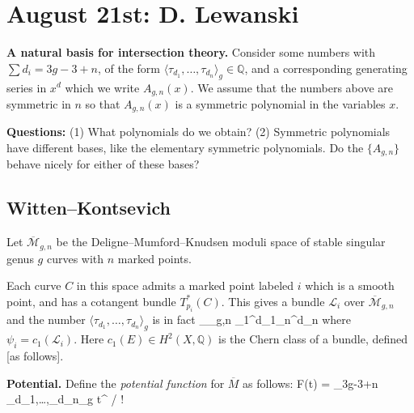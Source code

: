 \documentclass[fleqn,a4paper, twoside]{article}
\title{\vspace{-5 em}\setstretch{0.85}{\textbf{Matamzee 2021}}}
\author{P. Tamaroff}
\date{August 2021}
\makeatletter
\newcommand{\0}{\langle 0\rangle}
\let\[\@undefined
\DeclareRobustCommand{\[}{\begin{equation}}%
\let\]\@undefined
\DeclareRobustCommand{\]}{\end{equation}}%
\theoremstyle{mytheorem}
\theoremstyle{introthm}
\theoremstyle{mydefinition}
\theoremstyle{mydefinition2}
\theoremstyle{plain} %
\newcommand{\?}{\,?\,}
\theoremstyle{mytheorem}
\theoremstyle{plain} %
\makeatother
\begin{document}
\maketitle


\thispagestyle{empty}

\tableofcontents

\section{August 21st: D. Lewanski}

\textbf{A natural basis for intersection theory.}
Consider some numbers with $\sum d_i = 3g-3+n$, of the form
$\langle \tau_{d_1},\ldots,\tau_{d_n}\rangle_g \in \mathbb Q$,
and a corresponding generating series in $x^d$ which we 
write $A_{g,n}(x)$. We assume that the numbers above are
symmetric in $n$ so that $A_{g,n}(x)$ is a symmetric
polynomial in the variables $x$.

\textbf{Questions:} (1) What polynomials do we obtain?
(2) Symmetric polynomials have different
bases, like the elementary symmetric polynomials. Do
the $\{A_{g,n}\}$ behave nicely for either of these 
bases? 

\subsection{Witten--Kontsevich}

Let $\overline{\mathcal{M}}_{g,n}$ be the 
Deligne--Mumford--Knudsen moduli space of 
stable singular genus $g$ curves with $n$
marked points. 

Each curve $C$ in this space admits 
a marked point labeled $i$ which is 
a smooth point, and has a cotangent bundle
$T_{p_i}^*(C)$. This gives a bundle 
$\mathcal L_i$ over $\overline{\mathcal{M}}_{g,n}$
and the number $\langle \tau_{d_1},\ldots,\tau_{d_n}\rangle_g$
is in fact 
\[ \int_{_{g,n}}
 \psi_1^{d_1}\cdots \psi_n^{d_n} \]
 where  $\psi_i = c_1(\mathcal{L}_i)$. Here
 $c_1(E)\in H^2(X,\mathbb Q)$ is the Chern class
 of a bundle, defined [as follows].
 
 \textbf{Potential.} 
 Define the \emph{potential function} for $\overline{M}$ as
 follows:
 \[ F(t) = \sum_{3g-3+n} \langle \tau_{d_1},\ldots,\tau_{d_n}\rangle_g t^{} / ! \]
 
\end{document}
